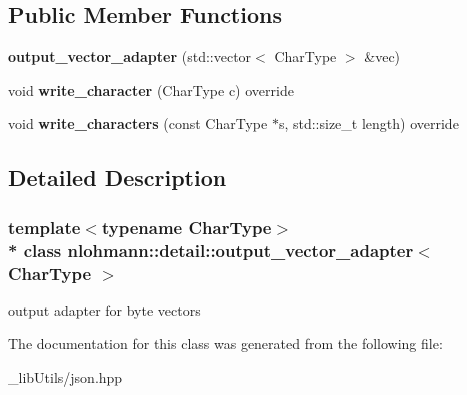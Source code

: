 \subsection*{Public Member Functions}
\begin{DoxyCompactItemize}
\item 
{\bfseries output\+\_\+vector\+\_\+adapter} (std\+::vector$<$ Char\+Type $>$ \&vec)\hypertarget{classnlohmann_1_1detail_1_1output__vector__adapter_abc6695e8c0274afad31bd581c8acf24f}{}\label{classnlohmann_1_1detail_1_1output__vector__adapter_abc6695e8c0274afad31bd581c8acf24f}

\item 
void {\bfseries write\+\_\+character} (Char\+Type c) override\hypertarget{classnlohmann_1_1detail_1_1output__vector__adapter_af6a22d4210bb7bc2da66021300ddd6db}{}\label{classnlohmann_1_1detail_1_1output__vector__adapter_af6a22d4210bb7bc2da66021300ddd6db}

\item 
void {\bfseries write\+\_\+characters} (const Char\+Type $\ast$s, std\+::size\+\_\+t length) override\hypertarget{classnlohmann_1_1detail_1_1output__vector__adapter_ad6f6c461dec7bedd5359454dc22fc9aa}{}\label{classnlohmann_1_1detail_1_1output__vector__adapter_ad6f6c461dec7bedd5359454dc22fc9aa}

\end{DoxyCompactItemize}


\subsection{Detailed Description}
\subsubsection*{template$<$typename Char\+Type$>$\\*
class nlohmann\+::detail\+::output\+\_\+vector\+\_\+adapter$<$ Char\+Type $>$}

output adapter for byte vectors 

The documentation for this class was generated from the following file\+:\begin{DoxyCompactItemize}
\item 
\+\_\+lib\+Utils/json.\+hpp\end{DoxyCompactItemize}
